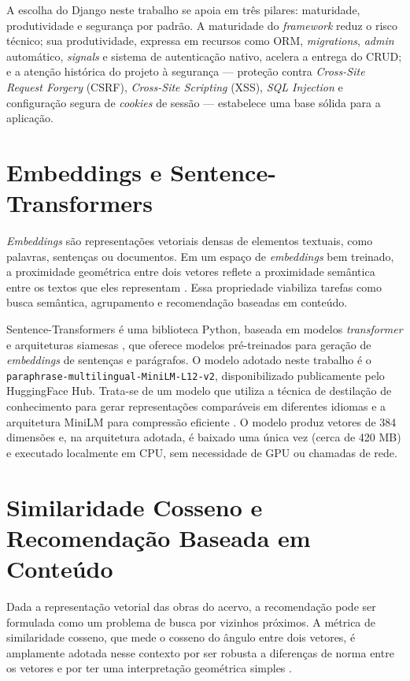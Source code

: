 \documentclass[monografia,abnt]{inf-ufg-modificado}
\begin{document}
A escolha do Django neste trabalho se apoia em três pilares: maturidade, produtividade e segurança por padrão. A maturidade do \textit{framework} reduz o risco técnico; sua produtividade, expressa em recursos como ORM, \textit{migrations}, \textit{admin} automático, \textit{signals} e sistema de autenticação nativo, acelera a entrega do CRUD; e a atenção histórica do projeto à segurança --- proteção contra \textit{Cross-Site Request Forgery} (CSRF), \textit{Cross-Site Scripting} (XSS), \textit{SQL Injection} e configuração segura de \textit{cookies} de sessão --- estabelece uma base sólida para a aplicação.

\section{Embeddings e Sentence-Transformers}

\textit{Embeddings} são representações vetoriais densas de elementos textuais, como palavras, sentenças ou documentos. Em um espaço de \textit{embeddings} bem treinado, a proximidade geométrica entre dois vetores reflete a proximidade semântica entre os textos que eles representam \cite{mikolov}. Essa propriedade viabiliza tarefas como busca semântica, agrupamento e recomendação baseadas em conteúdo.

Sentence-Transformers é uma biblioteca Python, baseada em modelos \textit{transformer} e arquiteturas siamesas \cite{sbert}, que oferece modelos pré-treinados para geração de \textit{embeddings} de sentenças e parágrafos. O modelo adotado neste trabalho é o \texttt{paraphrase-multilingual-MiniLM-L12-v2}, disponibilizado publicamente pelo HuggingFace Hub. Trata-se de um modelo que utiliza a técnica de destilação de conhecimento para gerar representações comparáveis em diferentes idiomas \cite{sbert-multilingual} e a arquitetura MiniLM para compressão eficiente \cite{minilm}. O modelo produz vetores de 384 dimensões e, na arquitetura adotada, é baixado uma única vez (cerca de 420 MB) e executado localmente em CPU, sem necessidade de GPU ou chamadas de rede.

\section{Similaridade Cosseno e Recomendação Baseada em Conteúdo}

Dada a representação vetorial das obras do acervo, a recomendação pode ser formulada como um problema de busca por vizinhos próximos. A métrica de similaridade cosseno, que mede o cosseno do ângulo entre dois vetores, é amplamente adotada nesse contexto por ser robusta a diferenças de norma entre os vetores e por ter uma interpretação geométrica simples \cite{manning}.
\end{document}
